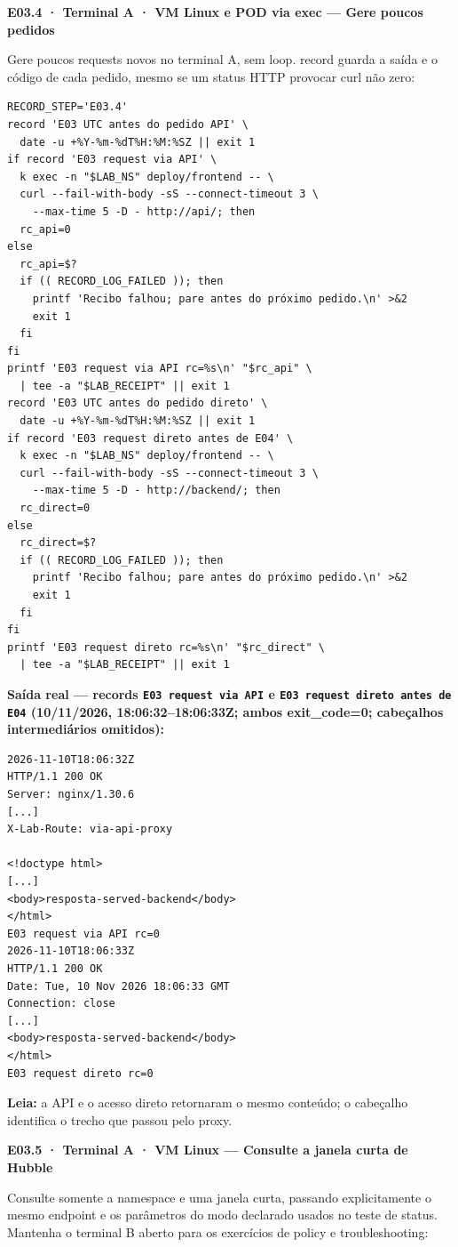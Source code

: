 \documentclass[12pt,openany,oneside,a4paper,chapter=TITLE,english,brazil]{abntex2}
\begin{document}
\textbf{E03.4 · Terminal A · VM Linux e POD via exec --- Gere poucos pedidos}

Gere poucos requests novos no terminal A, sem loop. record guarda a saída e o código de cada pedido, mesmo se um status HTTP provocar curl não zero:

\begin{verbatim}
RECORD_STEP='E03.4'
record 'E03 UTC antes do pedido API' \
  date -u +%Y-%m-%dT%H:%M:%SZ || exit 1
if record 'E03 request via API' \
  k exec -n "$LAB_NS" deploy/frontend -- \
  curl --fail-with-body -sS --connect-timeout 3 \
    --max-time 5 -D - http://api/; then
  rc_api=0
else
  rc_api=$?
  if (( RECORD_LOG_FAILED )); then
    printf 'Recibo falhou; pare antes do próximo pedido.\n' >&2
    exit 1
  fi
fi
printf 'E03 request via API rc=%s\n' "$rc_api" \
  | tee -a "$LAB_RECEIPT" || exit 1
record 'E03 UTC antes do pedido direto' \
  date -u +%Y-%m-%dT%H:%M:%SZ || exit 1
if record 'E03 request direto antes de E04' \
  k exec -n "$LAB_NS" deploy/frontend -- \
  curl --fail-with-body -sS --connect-timeout 3 \
    --max-time 5 -D - http://backend/; then
  rc_direct=0
else
  rc_direct=$?
  if (( RECORD_LOG_FAILED )); then
    printf 'Recibo falhou; pare antes do próximo pedido.\n' >&2
    exit 1
  fi
fi
printf 'E03 request direto rc=%s\n' "$rc_direct" \
  | tee -a "$LAB_RECEIPT" || exit 1
\end{verbatim}

\textbf{Saída real --- records \texttt{E03 request via API} e \texttt{E03 request direto antes de E04} (10/11/2026, 18:06:32--18:06:33Z; ambos exit\_code=0; cabeçalhos intermediários omitidos):}

\begin{verbatim}
2026-11-10T18:06:32Z
HTTP/1.1 200 OK
Server: nginx/1.30.6
[...]
X-Lab-Route: via-api-proxy

<!doctype html>
[...]
<body>resposta-served-backend</body>
</html>
E03 request via API rc=0
2026-11-10T18:06:33Z
HTTP/1.1 200 OK
Date: Tue, 10 Nov 2026 18:06:33 GMT
Connection: close
[...]
<body>resposta-served-backend</body>
</html>
E03 request direto rc=0
\end{verbatim}

\textbf{Leia:} a API e o acesso direto retornaram o mesmo conteúdo; o cabeçalho identifica o trecho que passou pelo proxy.

\textbf{E03.5 · Terminal A · VM Linux --- Consulte a janela curta de Hubble}

Consulte somente a namespace e uma janela curta, passando explicitamente o mesmo endpoint e os parâmetros do modo declarado usados no teste de status. Mantenha o terminal B aberto para os exercícios de policy e troubleshooting:
\end{document}
